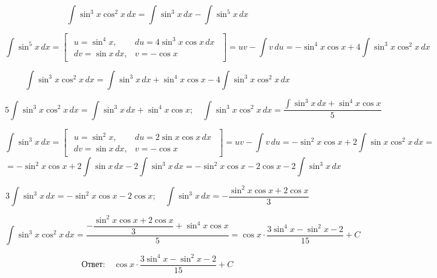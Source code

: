 \[
\int \sin^3 x \cos^2 x\, dx = \int \sin^3 x\, dx - \int \sin^5 x\, dx
\]

\[
\int \sin^5 x\, dx =
    \begin{bmatrix}
        \begin{array}{ll}
            u = \sin^4 x, & du = 4\sin^3 x \cos x \,dx \\
            dv = \sin x \,dx, & v = -\cos x
        \end{array}
    \end{bmatrix} =
    uv - \int v\, du =
    -\sin^4 x \cos x + 4 \int \sin^3 x \cos^2 x\, dx
\]

\[
\int \sin^3 x \cos^2 x\, dx = \int \sin^3 x\, dx + \sin^4 x \cos x - 4 \int \sin^3 x \cos^2 x\, dx
\]

\[
5 \int \sin^3 x \cos^2 x\, dx = \int \sin^3 x\, dx + \sin^4 x \cos x; \quad 
\int \sin^3 x \cos^2 x\, dx = \frac{\int \sin^3 x\, dx + \sin^4 x \cos x}{5}
\]

\[
\int \sin^3 x\, dx =
    \begin{bmatrix}
        \begin{array}{ll}
            u = \sin^2 x, & du = 2\sin x \cos x \,dx \\
            dv = \sin x \,dx, & v = -\cos x
        \end{array}
    \end{bmatrix} =
    uv - \int v\, du =
    -\sin^2 x \cos x + 2 \int \sin x \cos^2 x\, dx =
\]
\[
= -\sin^2 x \cos x + 2 \int \sin x\, dx - 2 \int \sin^3 x\, dx = 
  -\sin^2 x \cos x - 2 \cos x - 2 \int \sin^3 x\, dx
\]

\[
3 \int \sin^3 x\, dx = -\sin^2 x \cos x - 2 \cos x; \quad 
\int \sin^3 x\, dx = - \dfrac{\sin^2 x \cos x + 2 \cos x}{3} 
\]

\[
\int \sin^3 x \cos^2 x\, dx =
\dfrac{- \dfrac{\sin^2 x \cos x + 2 \cos x}{3} + \sin^4 x \cos x}{5} = 
\cos x \cdot \dfrac{3 \sin^4 x - \sin^2 x - 2}{15} + C
\]

\[
\textbf{Ответ:} \quad \cos x \cdot \dfrac{3 \sin^4 x - \sin^2 x - 2}{15} + C
\]